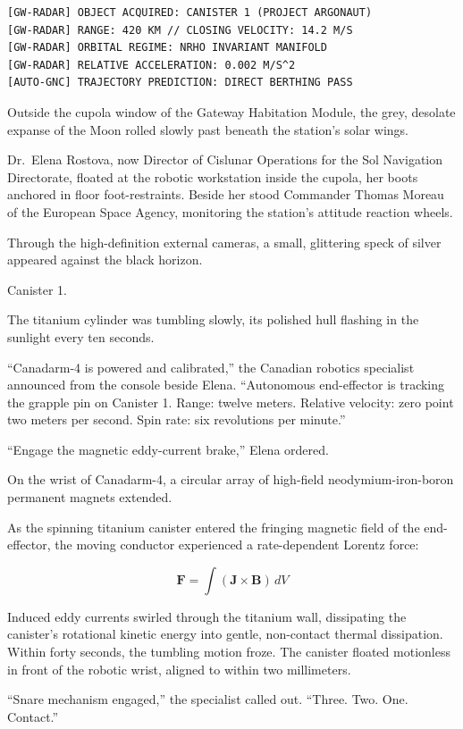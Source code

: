 \documentclass[12pt,twoside,openright]{book}
\begin{document}
\begin{lstlisting}
[GW-RADAR] OBJECT ACQUIRED: CANISTER 1 (PROJECT ARGONAUT)
[GW-RADAR] RANGE: 420 KM // CLOSING VELOCITY: 14.2 M/S
[GW-RADAR] ORBITAL REGIME: NRHO INVARIANT MANIFOLD
[GW-RADAR] RELATIVE ACCELERATION: 0.002 M/S^2
[AUTO-GNC] TRAJECTORY PREDICTION: DIRECT BERTHING PASS
\end{lstlisting}

Outside the cupola window of the Gateway Habitation Module, the grey,
desolate expanse of the Moon rolled slowly past beneath the station's
solar wings.

Dr.~Elena Rostova, now Director of Cislunar Operations for the Sol
Navigation Directorate, floated at the robotic workstation inside the
cupola, her boots anchored in floor foot-restraints. Beside her stood
Commander Thomas Moreau of the European Space Agency, monitoring the
station's attitude reaction wheels.

Through the high-definition external cameras, a small, glittering speck
of silver appeared against the black horizon.

Canister 1.

The titanium cylinder was tumbling slowly, its polished hull flashing in
the sunlight every ten seconds.

``Canadarm-4 is powered and calibrated,'' the Canadian robotics
specialist announced from the console beside Elena. ``Autonomous
end-effector is tracking the grapple pin on Canister 1. Range: twelve
meters. Relative velocity: zero point two meters per second. Spin rate:
six revolutions per minute.''

``Engage the magnetic eddy-current brake,'' Elena ordered.

On the wrist of Canadarm-4, a circular array of high-field
neodymium-iron-boron permanent magnets extended.

As the spinning titanium canister entered the fringing magnetic field of
the end-effector, the moving conductor experienced a rate-dependent
Lorentz force:

\[\mathbf{F} = \int (\mathbf{J} \times \mathbf{B}) \, dV\]

Induced eddy currents swirled through the titanium wall, dissipating the
canister's rotational kinetic energy into gentle, non-contact thermal
dissipation. Within forty seconds, the tumbling motion froze. The
canister floated motionless in front of the robotic wrist, aligned to
within two millimeters.

``Snare mechanism engaged,'' the specialist called out. ``Three. Two.
One. Contact.''
\end{document}
